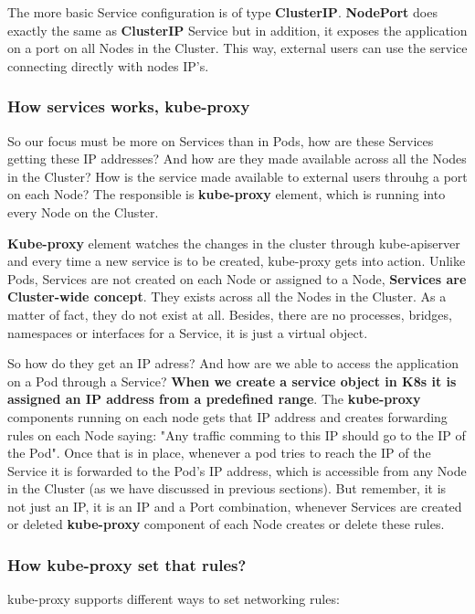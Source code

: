 \documentclass{article}
\begin{document}
The more basic Service configuration is of type \textbf{ClusterIP}. \textbf{NodePort} does exactly the same as \textbf{ClusterIP} Service but in addition, it exposes the application on a port on all Nodes in the Cluster. This way, external users can use the service connecting directly with nodes IP's.

\subsubsection{How services works, kube-proxy}

So our focus must be more on Services than in Pods, how are these Services getting these IP addresses? And how are they made available across all the Nodes in the Cluster? How is the service made available to external users throuhg a port on each Node? The responsible is \textbf{kube-proxy} element, which is running into every Node on the Cluster.

\textbf{Kube-proxy} element watches the changes in the cluster through kube-apiserver and every time a new service is to be created, kube-proxy gets into action. Unlike Pods, Services are not created on each Node or assigned to a Node, \textbf{Services are Cluster-wide concept}. They exists across all the Nodes in the Cluster. As a matter of fact, they do not exist at all. Besides, there are no processes, bridges, namespaces or interfaces for a Service, it is just a virtual object. 

So how do they get an IP adress? And how are we able to access the application on a Pod through a Service? \textbf{When we create a service object in K8s it is assigned an IP address from a predefined range}. The \textbf{kube-proxy} components running on each node gets that IP address and creates forwarding rules on each Node saying: "Any traffic comming to this IP should go to the IP of the Pod". Once that is in place, whenever a pod tries to reach the IP of the Service it is forwarded to the Pod's IP address, which is accessible from any Node in the Cluster (as we have discussed in previous sections). But remember, it is not just an IP, it is an IP and a Port combination, whenever Services are created or deleted \textbf{kube-proxy} component of each Node creates or delete these rules.

\subsubsection{How kube-proxy set that rules?}

kube-proxy supports different ways to set networking rules:
\end{document}
